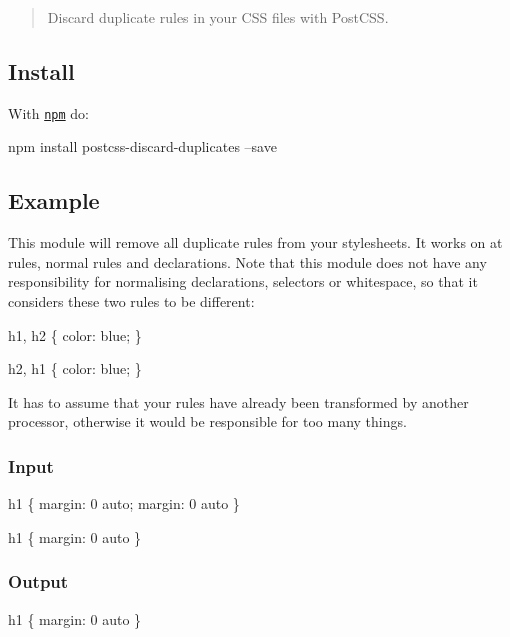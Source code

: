 \begin{quote}
Discard duplicate rules in your C\+SS files with Post\+C\+SS. \end{quote}


\subsection*{Install}

With \href{https://npmjs.org/package/postcss-discard-duplicates}{\tt npm} do\+:


\begin{DoxyCode}
npm install postcss-discard-duplicates --save
\end{DoxyCode}


\subsection*{Example}

This module will remove all duplicate rules from your stylesheets. It works on at rules, normal rules and declarations. Note that this module does not have any responsibility for normalising declarations, selectors or whitespace, so that it considers these two rules to be different\+:


\begin{DoxyCode}
h1, h2 \{
    color: blue;
\}

h2, h1 \{
    color: blue;
\}
\end{DoxyCode}


It has to assume that your rules have already been transformed by another processor, otherwise it would be responsible for too many things.

\subsubsection*{Input}


\begin{DoxyCode}
h1 \{
    margin: 0 auto;
    margin: 0 auto
\}

h1 \{
    margin: 0 auto
\}
\end{DoxyCode}


\subsubsection*{Output}


\begin{DoxyCode}
h1 \{
    margin: 0 auto
\}
\end{DoxyCode}


